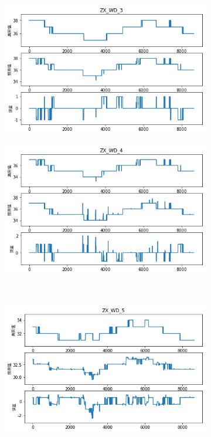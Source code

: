 \begin{figure}[H]
\begin{subfigure}[t]{0.48\textwidth}
  \includegraphics[scale=0.45]{figures/sr/deap-zw_wd_3.png}
\end{subfigure}\hfill
\begin{subfigure}[t]{0.48\textwidth}
    \centering
    \includegraphics[scale=0.45]{figures/sr/deap-zw_wd_4.png}
\end{subfigure}\\
\begin{subfigure}[t]{0.48\textwidth}
  \centering
  \includegraphics[scale=0.45]{figures/sr/deap-zw_wd_5.png}

\end{subfigure}
\end{figure}
